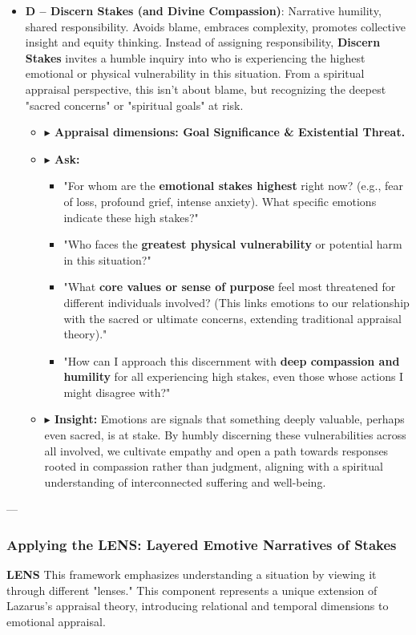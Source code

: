 \documentclass{article}
\begin{document}
\begin{itemize}[noitemsep,topsep=0pt]
    \item \textbf{D – Discern Stakes (and Divine Compassion)}: Narrative humility, shared responsibility. Avoids blame, embraces complexity, promotes collective insight and equity thinking. Instead of assigning responsibility, \textbf{Discern Stakes} invites a humble inquiry into who is experiencing the highest emotional or physical vulnerability in this situation. From a spiritual appraisal perspective, this isn't about blame, but recognizing the deepest "sacred concerns" or "spiritual goals" at risk.
    \begin{itemize}[noitemsep,topsep=0pt]
        \item \textbf{$\blacktriangleright$ Appraisal dimensions: Goal Significance \& Existential Threat.}
        \item \textbf{$\blacktriangleright$ Ask:}
        \begin{itemize}[noitemsep,topsep=0pt]
            \item "For whom are the \textbf{emotional stakes highest} right now? (e.g., fear of loss, profound grief, intense anxiety). What specific emotions indicate these high stakes?"
            \item "Who faces the \textbf{greatest physical vulnerability} or potential harm in this situation?"
            \item "What \textbf{core values or sense of purpose} feel most threatened for different individuals involved? (This links emotions to our relationship with the sacred or ultimate concerns, extending traditional appraisal theory)."
            \item "How can I approach this discernment with \textbf{deep compassion and humility} for all experiencing high stakes, even those whose actions I might disagree with?"
        \end{itemize}
        \item \textbf{$\blacktriangleright$ Insight:} Emotions are signals that something deeply valuable, perhaps even sacred, is at stake. By humbly discerning these vulnerabilities across all involved, we cultivate empathy and open a path towards responses rooted in compassion rather than judgment, aligning with a spiritual understanding of interconnected suffering and well-being.
    \end{itemize}
\end{itemize}

---

\subsubsection*{\textbf{Applying the LENS: Layered Emotive Narratives of Stakes}}
\textbf{LENS} This framework emphasizes understanding a situation by viewing it through different "lenses." This component represents a unique extension of Lazarus's appraisal theory, introducing relational and temporal dimensions to emotional appraisal.
\end{document}
